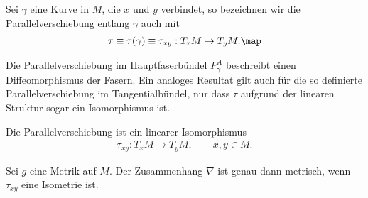 \documentclass[%
	paper=a5,%
	fleqn,%
	DIV=18,%
	BCOR=0mm,
	fontsize=11pt,
	titlepage=false,%
	bibliography=totoc,
	DIV=18,%
	twoside=true,
	pdftitle=Riemannsche Geometrie,
	pdfauthor=Uwe Semmelmann,
	numbers=noendperiod]%
	{scrbook}
\begin{document}
\begin{rem}
Sei $\gamma$ eine Kurve in $M$, die $x$ und $y$ verbindet, so bezeichnen wir die
Parallelverschiebung entlang $\gamma$ auch mit
\begin{align*}
\tau \equiv \tau(\gamma) \equiv \tau_{xy} : T_xM\to T_yM.\map 
\end{align*}
\end{rem}

Die Parallelverschiebung im Hauptfaserbündel $P_\gamma^A$ beschreibt einen
Diffeomorphismus der Fasern. Ein analoges Resultat gilt auch für die so
definierte Parallelverschiebung im Tangentialbündel, nur dass $\tau$ aufgrund
der linearen Struktur sogar ein Isomorphismus ist.

\begin{lem}
\begin{propenum}
\item Die Parallelverschiebung ist ein linearer Isomorphismus
\begin{align*}
\tau_{xy}: T_xM\to T_yM,\qquad x,y\in M.
\end{align*}
\item Sei $g$ eine Metrik auf $M$. Der Zusammenhang $\nabla$ ist genau dann
metrisch, wenn $\tau_{xy}$ eine Isometrie ist.\fish
\end{propenum}
\end{lem}
\end{document}
